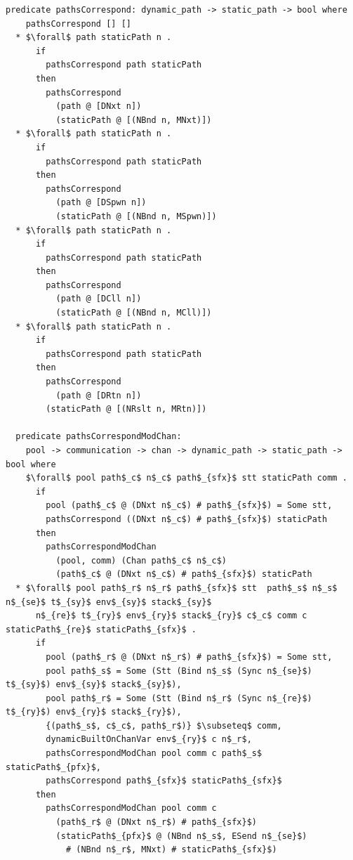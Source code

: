 \documentclass[letterpaper, 11pt]{extarticle}
\begin{document}
\begin{lstlisting}[language=logic, mathescape]
  predicate pathsCorrespond: dynamic_path -> static_path -> bool where
    pathsCorrespond [] []
  * $\forall$ path staticPath n .
      if
        pathsCorrespond path staticPath
      then
        pathsCorrespond
          (path @ [DNxt n])
          (staticPath @ [(NBnd n, MNxt)])
  * $\forall$ path staticPath n .
      if
        pathsCorrespond path staticPath
      then
        pathsCorrespond
          (path @ [DSpwn n])
          (staticPath @ [(NBnd n, MSpwn)])
  * $\forall$ path staticPath n .
      if
        pathsCorrespond path staticPath
      then
        pathsCorrespond
          (path @ [DCll n])
          (staticPath @ [(NBnd n, MCll)])
  * $\forall$ path staticPath n .
      if
        pathsCorrespond path staticPath
      then
        pathsCorrespond
          (path @ [DRtn n])
        (staticPath @ [(NRslt n, MRtn)])

  predicate pathsCorrespondModChan:
    pool -> communication -> chan -> dynamic_path -> static_path -> bool where
    $\forall$ pool path$_c$ n$_c$ path$_{sfx}$ stt staticPath comm .
      if
        pool (path$_c$ @ (DNxt n$_c$) # path$_{sfx}$) = Some stt,
        pathsCorrespond ((DNxt n$_c$) # path$_{sfx}$) staticPath
      then
        pathsCorrespondModChan
          (pool, comm) (Chan path$_c$ n$_c$)
          (path$_c$ @ (DNxt n$_c$) # path$_{sfx}$) staticPath
  * $\forall$ pool path$_r$ n$_r$ path$_{sfx}$ stt  path$_s$ n$_s$ n$_{se}$ t$_{sy}$ env$_{sy}$ stack$_{sy}$
      n$_{re}$ t$_{ry}$ env$_{ry}$ stack$_{ry}$ c$_c$ comm c staticPath$_{re}$ staticPath$_{sfx}$ . 
      if
        pool (path$_r$ @ (DNxt n$_r$) # path$_{sfx}$) = Some stt, 
        pool path$_s$ = Some (Stt (Bind n$_s$ (Sync n$_{se}$) t$_{sy}$) env$_{sy}$ stack$_{sy}$),
        pool path$_r$ = Some (Stt (Bind n$_r$ (Sync n$_{re}$) t$_{ry}$) env$_{ry}$ stack$_{ry}$),
        {(path$_s$, c$_c$, path$_r$)} $\subseteq$ comm, 
        dynamicBuiltOnChanVar env$_{ry}$ c n$_r$, 
        pathsCorrespondModChan pool comm c path$_s$ staticPath$_{pfx}$,
        pathsCorrespond path$_{sfx}$ staticPath$_{sfx}$
      then
        pathsCorrespondModChan pool comm c
          (path$_r$ @ (DNxt n$_r$) # path$_{sfx}$)
          (staticPath$_{pfx}$ @ (NBnd n$_s$, ESend n$_{se}$)
            # (NBnd n$_r$, MNxt) # staticPath$_{sfx}$)
\end{lstlisting}
\end{document}
